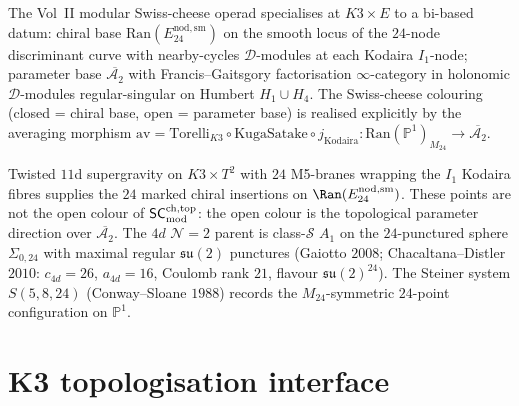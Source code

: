 \begin{remark}
\label{rem:msc-bi-based}
The Vol~II modular Swiss-cheese operad specialises at $K3 \times E$ to a bi-based
datum: chiral base $\mathrm{Ran}(E^{\mathrm{nod,sm}}_{24})$ on the smooth locus of the
$24$-node discriminant curve with nearby-cycles $\mathcal{D}$-modules at each Kodaira
$I_1$-node; parameter base $\overline{\mathcal{A}_2}$ with Francis--Gaitsgory
factorisation $\infty$-category in holonomic $\mathcal{D}$-modules regular-singular on
Humbert $H_1 \cup H_4$. The Swiss-cheese colouring (closed = chiral base, open =
parameter base) is realised explicitly by the averaging morphism
$\mathrm{av} = \mathrm{Torelli}_{K3} \circ \mathrm{KugaSatake} \circ j_{\mathrm{Kodaira}}
\colon \mathrm{Ran}(\mathbb{P}^1)_{M_{24}} \to \overline{\mathcal{A}_2}$.
\end{remark}

\begin{remark}
\label{rem:msc-24-M5-punctures}
Twisted $11$d supergravity on $K3 \times T^2$ with $24$ M5-branes
wrapping the $I_1$ Kodaira fibres supplies the $24$ marked chiral
insertions on $\Ran(E^{\mathrm{nod,sm}}_{24})$. These points are not
the open colour of $\mathsf{SC}^{\mathrm{ch,top}}_{\mathrm{mod}}$: the open colour is the topological
parameter direction over $\overline{\mathcal A_2}$. The $4d$
$\mathcal{N}=2$ parent is class-$\mathcal S$ $A_1$ on the
$24$-punctured sphere $\Sigma_{0,24}$ with maximal regular
$\mathfrak{su}(2)$ punctures (Gaiotto $2008$; Chacaltana--Distler
$2010$: $c_{4d}=26$, $a_{4d}=16$, Coulomb rank $21$, flavour
$\mathfrak{su}(2)^{24}$). The Steiner system $S(5,8,24)$
(Conway--Sloane $1988$) records the $M_{24}$-symmetric
$24$-point configuration on $\mathbb{P}^1$.
\end{remark}

\section{K3 topologisation interface}
\label{sec:msco-deep}

